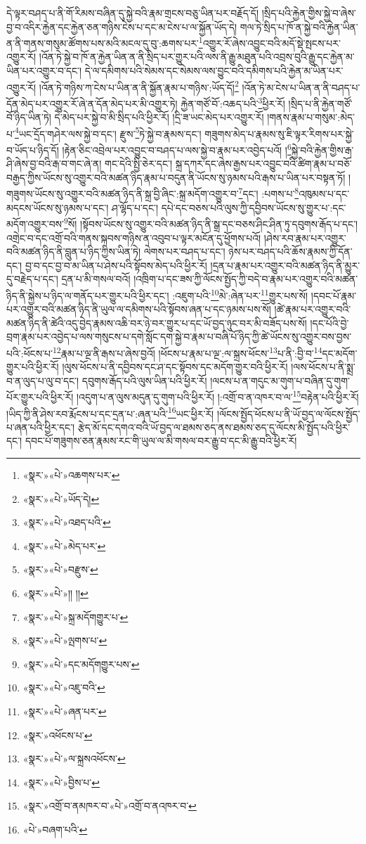 དེ་ལྟར་བཤད་པ་ནི་གོ་རིམས་བཞིན་དུ་སྐྱེ་བའི་རྣམ་གྲངས་བཅུ་ཡིན་པར་བརྗོད་དོ། །སྲིད་པའི་རྐྱེན་གྱིས་སྐྱེ་བ་ཞེས་བྱ་བ་འདིར་རྐྱེན་དང་རྐྱེན་ཅན་གཉིས་ངེས་པ་དང་མ་ངེས་པ་ལ་སྐྱོན་ཡོད་དེ། གལ་ཏེ་སྲིད་པ་ཁོ་ན་སྐྱེ་བའི་རྐྱེན་ཡིན་ན་ནི་གནས་གསུམ་ཚོགས་པས་མའི་མངལ་དུ་བུ་:ཆགས་པར་\footnote{«སྣར་»«པེ་»འཆགས་པར་}འགྱུར་རོ་ཞེས་འབྱུང་བའི་མདོ་སྡེ་སྤངས་པར་འགྱུར་རོ། །འོན་ཏེ་སྐྱེ་བ་ཁོ་ན་རྐྱེན་ཡིན་ན་ནི་སྲིད་པར་གྱུར་པའི་ལས་ནི་རྒྱུ་མཐུན་པའི་འབྲས་བུའི་རྒྱུ་དང་རྐྱེན་མ་ཡིན་པར་འགྱུར་བ་དང་། དེ་ལ་དམིགས་པའི་སེམས་དང་སེམས་ལས་བྱུང་བའི་དམིགས་པའི་རྐྱེན་མ་ཡིན་པར་འགྱུར་རོ། །འོན་ཏེ་གཉིས་ཀ་ངེས་པ་ཡིན་ན་ནི་སྐྱོན་རྣམ་པ་གཉིས་:ཡོད་དོ།\footnote{«སྣར་»«པེ་»ཡོད་དེ།} །འོན་ཏེ་མ་ངེས་པ་ཡིན་ན་ནི་བཤད་པ་དོན་མེད་པར་འགྱུར་རོ་ཞེ་ན་དོན་མེད་པར་མི་འགྱུར་ཏེ། རྐྱེན་གཙོ་བོ་:འཆད་པའི་\footnote{«སྣར་»«པེ་»འཐད་པའི་}ཕྱིར་རོ། །སྲིད་པ་ནི་རྐྱེན་གཙོ་བོ་ཉིད་ཡིན་ཏེ། དེ་མེད་པར་སྐྱེ་བ་མི་སྲིད་པའི་ཕྱིར་རོ། །དྲི་ཟ་ཡང་མེད་པར་འགྱུར་རོ། །གནས་རྣམ་པ་གསུམ་:མེད་པ་\footnote{«སྣར་»«པེ་»མེད་པར་}ཡང་དྲོད་གཤེར་ལས་སྐྱེ་བ་དང་། རྫུས་\footnote{«སྣར་»«པེ་»བརྫུས་}ཏེ་སྐྱེ་བ་རྣམས་དང་། གཟུགས་མེད་པ་རྣམས་སུ་ཇི་ལྟར་རིགས་པར་སྐྱེ་བ་ཡོད་པ་ཉིད་དོ། །རྟེན་ཅིང་འབྲེལ་པར་འབྱུང་བ་བཤད་པ་ལས་སྐྱེ་བ་རྣམ་པར་འབྱེད་པའོ། །\footnote{«སྣར་»«པེ་»།། །།}སྐྱེ་བའི་རྐྱེན་གྱིས་རྒ་ཤི་ཞེས་བྱ་བའི་རྒ་བ་གང་ཞེ་ན། གང་དེའི་སྤྱི་ཅེར་དང་། སྐྲ་དཀར་དང་ཞེས་རྒྱས་པར་འབྱུང་བའི་ཚིག་རྣམ་པ་བཅོ་བརྒྱད་ཀྱིས་ཡོངས་སུ་འགྱུར་བའི་མཚན་ཉིད་རྣམ་པ་བདུན་ནི་ཡོངས་སུ་ཉམས་པའི་རྒས་པ་ཡིན་པར་བསྟན་ཏོ། །གཟུགས་ཡོངས་སུ་འགྱུར་བའི་མཚན་ཉིད་ནི་སྐྲ་བྱི་ཞིང་:སྐྲ་མདོག་འགྱུར་བ་\footnote{«སྣར་»«པེ་»སྐྲ་མདོགགྱུར་པ་}དང་། :པགས་པ་\footnote{«སྣར་»«པེ་»ལྤགས་པ་}འཁུམས་པ་དང་མདངས་ཡོངས་སུ་ཉམས་པ་དང་། ཤ་ལྷོད་པ་དང་། དཔེ་དང་བཅས་པའི་ལུས་ཀྱི་དབྱིབས་ཡོངས་སུ་གྱུར་པ་:དང་མདོག་འགྱུར་བས་\footnote{«སྣར་»«པེ་»དང་མདོགགྱུར་པས་}སོ། །སྟོབས་ཡོངས་སུ་འགྱུར་བའི་མཚན་ཉིད་ནི་སྒྲ་དང་བཅས་ཤིང་ཤིན་ཏུ་དབུགས་རྒོད་པ་དང་། འགྲེང་བ་དང་འགྲོ་བའི་གནས་སྐབས་གཉིས་ན་འབུབ་པ་ལྟར་མངོན་དུ་ཕྱོགས་པའོ། །ཤེས་རབ་རྣམ་པར་འགྱུར་བའི་མཚན་ཉིད་ནི་བླུན་པ་ཉིད་ཀྱིས་ཡིན་ཏེ། ལེགས་པར་བཤད་པ་དང་། ཉེས་པར་བཤད་པའི་ཆོས་རྣམས་ཀྱི་དོན་དང་། བྱ་བ་དང་བྱ་བ་མ་ཡིན་པ་ཤེས་པའི་སྟོབས་མེད་པའི་ཕྱིར་རོ། །དྲན་པ་རྣམ་པར་འགྱུར་བའི་མཚན་ཉིད་ནི་མྱུར་དུ་བརྗེད་པ་དང་། དྲན་པ་མི་གསལ་བའོ། །འཁྲིག་པ་དང་ཟས་ཀྱི་ལོངས་སྤྱོད་ཀྱི་བདེ་བ་རྣམ་པར་འགྱུར་བའི་མཚན་ཉིད་ནི་སྐྱེས་པ་ཉིད་ལ་གནོད་པར་གྱུར་པའི་ཕྱིར་དང་། :འཇུག་པའི་\footnote{«སྣར་»«པེ་»འཇུ་བའི་}མེ་:ཞེན་པར་\footnote{«སྣར་»«པེ་»ཞན་པར་}གྱུར་པས་སོ། །དབང་པོ་རྣམ་པར་འགྱུར་བའི་མཚན་ཉིད་ནི་ཡུལ་ལ་དམིགས་པའི་སྟོབས་ཞན་པ་དང་ཉམས་པས་སོ། །ཚེ་རྣམ་པར་འགྱུར་བའི་མཚན་ཉིད་ནི་ཚེའི་འདུ་བྱེད་རྣམས་འཆི་བར་ཉེ་བར་གྱུར་པ་དང་ཡོ་བྱད་ཉུང་བར་མི་བཟོད་པས་སོ། །དང་པོའི་བྱེ་བྲག་རྣམ་པར་འབྱེད་པ་ལས་གསུངས་པ་དགེ་སློང་དག་སྐྱེ་བ་རྣམ་པ་བཞི་པོ་ཉིད་ཀྱི་ཚེ་ཡོངས་སུ་འགྱུར་བས་བྱས་པའི་:ཕོངས་པ་\footnote{«སྣར་»འཕོངས་པ་}རྣམ་པ་ལྔ་ནི་རྒས་པ་ཞེས་བྱའོ། །ཕོངས་པ་རྣམ་པ་ལྔ་:ལ་སྐྲས་ཕོངས་\footnote{«སྣར་»«པེ་»ལ་སྐྲསའཕོངས་}པ་ནི་:བྱི་བ་\footnote{«སྣར་»«པེ་»བྱིས་པ་}དང་མདོག་གྱུར་པའི་ཕྱིར་རོ། །ལུས་ཕོངས་པ་ནི་དབྱིབས་དང་ཤ་དང་སྟོབས་དང་མདོག་གྱུར་བའི་ཕྱིར་རོ། །ལས་ཕོངས་པ་ནི་སྨྲ་བ་ན་ལུད་པ་ལུ་བ་དང་། དབུགས་རྒོད་པའི་ལུས་ཡིན་པའི་ཕྱིར་རོ། །ལངས་པ་ན་གདུང་མ་གུག་པ་བཞིན་དུ་གུག་པོར་གྱུར་པའི་ཕྱིར་རོ། །འདུག་པ་ན་ལུས་མདུན་དུ་གུག་པའི་ཕྱིར་རོ། །:འགྲོ་བ་ན་འཁར་བ་ལ་\footnote{«སྣར་»འགྲོ་བ་ནམཁར་བ་«པེ་»འགྲོ་བ་ནའཁར་བ་}བརྟེན་པའི་ཕྱིར་རོ། །ཡིད་ཀྱི་ནི་ཤེས་རབ་རྨོངས་པ་དང་དྲན་པ་:ཞན་པའི་\footnote{«པེ་»བཞག་པའི་}ཡང་ཕྱིར་རོ། །ལོངས་སྤྱོད་ཕོངས་པ་ནི་ཡོ་བྱད་ལ་ལོངས་སྤྱོད་པ་ཞན་པའི་ཕྱིར་དང་། རྩེད་མོ་དང་དགའ་བའི་ཡོ་བྱད་ལ་ཐམས་ཅད་ནས་ཐམས་ཅད་དུ་ལོངས་མི་སྤྱོད་པའི་ཕྱིར་དང་། དབང་པོ་གཟུགས་ཅན་རྣམས་རང་གི་ཡུལ་ལ་མི་གསལ་བར་རྒྱུ་བ་དང་མི་རྒྱུ་བའི་ཕྱིར་རོ། 